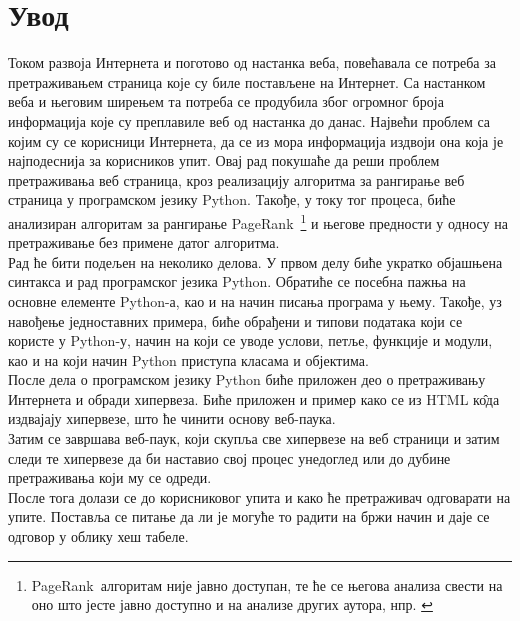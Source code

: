 \documentclass[11pt, serbianc, english, titlepage]{article}
\begin{document}



\newpage
{}
\tableofcontents
\newpage
{}

\section{Увод}
         Током развоја Интернета и поготово од настанка веба, повећавала се потреба за претраживањем страница које су биле постављене на Интернет. Са настанком веба и његовим ширењем та потреба се продубила због огромног броја информација које су преплавиле веб од настанка до данас. Највећи проблем са којим су се корисници Интернета, да се из мора информација издвоји она која је најподеснија за корисников упит. Овај рад покушаће да реши проблем претраживања  веб страница, кроз реализацију алгоритма за рангирање веб страница у програмском језику Python. Такође, у току тог процеса, биће анализиран алгоритам за рангирање PageRank\texttrademark\ \footnote{PageRank\texttrademark\ алгоритам није јавно доступан, те ће се његова анализа свести на оно што јесте јавно доступно и на анализе других аутора, нпр. \cite{langville2011google}  }  и његове предности у односу на претраживање без примене датог алгоритма.\\
         Рад ће бити подељен на неколико делова. У првом делу биће укратко објашњена синтакса и рад програмског језика Python. Обратиће се посебна пажња на основне елементе Python-а, као и на начин писања програма у њему. Такође, уз навођење једноставних примера, биће обрађени и типови података који се користе у Python-у, начин на који се уводе услови, петље, функције и модули, као и на који начин Python приступа класама и објектима.\\
         После дела о програмском језику Python биће приложен део о претраживању Интернета и обради хипервеза. Биће приложен и пример како се из HTML к\^{о}да издвајају хипервезе, што ће чинити основу веб-паука.\\
         Затим се завршава веб-паук, који скупља све хипервезе на веб страници и затим следи те хипервезе да би наставио свој процес унедоглед или до дубине претраживања који му се одреди. \\
         После тога долази се до корисниковог упита и како ће претраживач одговарати на упите. Поставља се питање да ли је могуће то радити на бржи начин и даје се одговор у облику хеш табеле.
\end{document}
